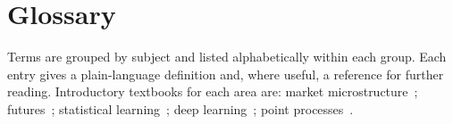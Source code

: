 \section{Glossary}
\label{app:glossary}

Terms are grouped by subject and listed alphabetically within each group. Each entry gives a
plain-language definition and, where useful, a reference for further reading. Introductory
textbooks for each area are: market microstructure~\citep{harris2003,ohara1995,hasbrouck2007};
futures~\citep{hull}; statistical learning~\citep{hastie2009}; deep learning~\citep{goodfellow2016};
point processes~\citep{daley2003}.

\newcommand{\gl}[1]{\item[#1]}

